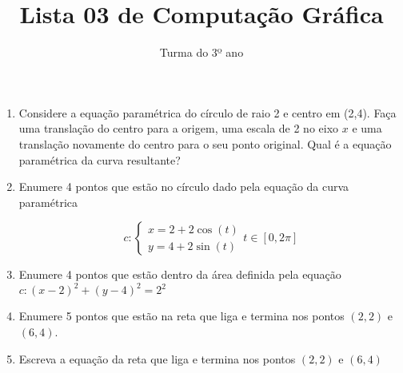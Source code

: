 \documentclass[12pt]{article}
\title{Lista 03 de Computação Gráfica}
\date{}
\author{Turma do 3º ano}
\begin{document}
\maketitle

\begin{enumerate}


\item Considere a equação paramétrica do círculo de raio 2 e centro em (2,4).
Faça uma translação do centro para a origem, uma escala de 2 no eixo $x$ e uma translação novamente do centro para o seu ponto original.
Qual é a equação paramétrica da curva resultante?


\item Enumere 4 pontos que estão no círculo dado pela equação da curva paramétrica

\[c:
\begin{cases}
	x=2+2\cos(t)\\
	y=4+2\sin(t)
\end{cases}
t\in \left[0, 2\pi\right]
\]


\item Enumere 4 pontos que estão dentro da área definida pela equação $c: (x-2)^2 + (y-4)^2 = 2^2$


\item Enumere 5 pontos que estão na reta que liga e termina nos pontos $(2, 2)$ e $(6, 4)$.


\item Escreva a equação da reta que liga e termina nos pontos $(2, 2)$ e $(6, 4)$






\end{enumerate}
\end{document}
